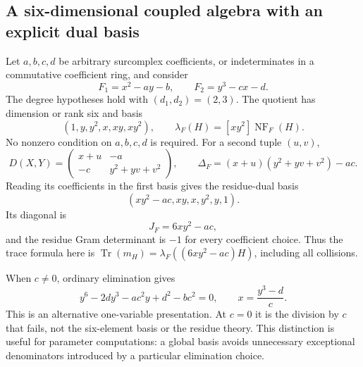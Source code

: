 \documentclass[11pt,letterpaper,oneside]{article}
\numberwithin{equation}{section}
\theoremstyle{definition}
\theoremstyle{remark}\newtheorem{remark}[theorem]{Remark}
\newcommand{\NF}{\operatorname{NF}}\newcommand{\Tr}{\operatorname{Tr}}
\begin{document}
\subsection{A six-dimensional coupled algebra with an explicit dual basis}\label{subsec:sixpoint}
Let $a,b,c,d$ be arbitrary surcomplex coefficients, or indeterminates in
a commutative coefficient ring, and consider
\begin{equation}\label{eq:sixsystem}
 F_1=x^2-ay-b,\qquad F_2=y^3-cx-d.
\end{equation}
The degree hypotheses hold with $(d_1,d_2)=(2,3)$.
The quotient has dimension or rank six and basis
\begin{equation}\label{eq:sixbasis}
 (1,y,y^2,x,xy,xy^2),\qquad \lambda_F(H)=[xy^2]\NF_F(H).
\end{equation}
No nonzero condition on $a,b,c,d$ is required. For a second tuple $(u,v)$,
\[
 D(X,Y)=\begin{pmatrix}x+u&-a\\-c&y^2+yv+v^2\end{pmatrix},
 \qquad
 \Delta_F=(x+u)(y^2+yv+v^2)-ac.
\]
Reading its coefficients in the first basis gives the residue-dual basis
\begin{equation}\label{eq:sixdual}
 (xy^2-ac,xy,x,y^2,y,1).
\end{equation}
Its diagonal is
\begin{equation}\label{eq:sixjacobian}
 J_F=6xy^2-ac,
\end{equation}
and the residue Gram determinant is $-1$ for every coefficient choice.
Thus the trace formula here is
$\Tr(m_H)=\lambda_F((6xy^2-ac)H)$, including all collisions.

When $c\ne0$, ordinary elimination gives
\begin{equation}\label{eq:sixelimination}
 y^6-2dy^3-ac^2y+d^2-bc^2=0,
 \qquad x=\frac{y^3-d}{c}.
\end{equation}
This is an alternative one-variable presentation. At $c=0$ it is the
division by $c$ that fails, not the six-element basis or the residue
theory. This distinction is useful for parameter computations: a global
basis avoids unnecessary exceptional denominators introduced by a
particular elimination choice.
\end{document}
